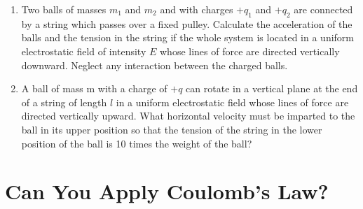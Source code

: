 \documentclass[a4paper,sfsidenotes]{tufte-book}
\begin{document}
\begin{enumerate}[resume=problems]
\item Two balls of masses $m_{1}$ and $m_{2}$ and with charges $+q_{1}$ and $+q_{2}$ are connected by a string which passes over a fixed pulley. Calculate the acceleration of the balls and the tension in the string if the whole system is located in a uniform electrostatic field of intensity $E$ whose lines of force are directed vertically downward. Neglect any interaction between the charged balls.
\item A ball of mass m with a charge of $+q$ can rotate in a vertical plane at the end of a string of length $l$ in a uniform electrostatic field whose lines of force are directed vertically upward. What horizontal velocity must be imparted to the ball in its upper position so that the tension of the string in the lower position of the ball is 10 times the weight of the ball?
\end{enumerate}

\chapter{Can You Apply Coulomb's Law?}
\label{ch-26}
\end{document}
